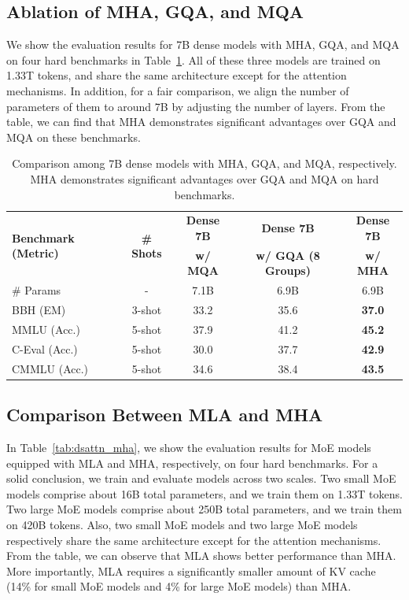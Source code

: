 \documentclass[11pt, a4paper, logo, copyright, nonumbering]{deepseek}
\newcommand{\dsattn}{MLA}
\begin{document}
\begin{CJK*}{UTF8}{gbsn}
\subsection{Ablation of MHA, GQA, and MQA}
\label{app:mha_gqa_mqa}

We show the evaluation results for 7B dense models with MHA, GQA, and MQA on four hard benchmarks in Table~\ref{tab:mha_gqa_mqa}. 
All of these three models are trained on 1.33T tokens, and share the same architecture except for the attention mechanisms. 
In addition, for a fair comparison, we align the number of parameters of them to around 7B by adjusting the number of layers. 
From the table, we can find that MHA demonstrates significant advantages over GQA and MQA on these benchmarks. 

\begin{table}[ht]
    \centering
    \begin{tabular}{@{}l c | c c c@{}}
    \toprule
    \multirow{2}{*}{\centering \textbf{Benchmark (Metric)}} & \multirow{2}{*}{\textbf{\# Shots}} & \textbf{Dense 7B} & \textbf{Dense 7B} & \textbf{Dense 7B} \\
     & & \textbf{w/ MQA} & \textbf{w/ GQA (8 Groups)} & \textbf{w/ MHA} \\
    \midrule
    \# Params & - & 7.1B & 6.9B & 6.9B \\
    \midrule
    BBH (EM) & 3-shot & 33.2 & 35.6 & \textbf{37.0} \\
    MMLU (Acc.) & 5-shot & 37.9 & 41.2 & \textbf{45.2} \\
    C-Eval (Acc.) & 5-shot & 30.0 & 37.7 & \textbf{42.9} \\
    CMMLU (Acc.) & 5-shot & 34.6 & 38.4 & \textbf{43.5} \\
    \bottomrule
    \end{tabular}
    \caption{
    Comparison among 7B dense models with MHA, GQA, and MQA, respectively. 
    MHA demonstrates significant advantages over GQA and MQA on hard benchmarks. 
    }
    \label{tab:mha_gqa_mqa}
\end{table}

\subsection{Comparison Between \dsattn{} and MHA}
\label{app:dsattn_mha}

In Table~\ref{tab:dsattn_mha}, we show the evaluation results for MoE models equipped with \dsattn{} and MHA, respectively, on four hard benchmarks. 
For a solid conclusion, we train and evaluate models across two scales. 
Two small MoE models comprise about 16B total parameters, and we train them on 1.33T tokens. 
Two large MoE models comprise about 250B total parameters, and we train them on 420B tokens. 
Also, two small MoE models and two large MoE models respectively share the same architecture except for the attention mechanisms. 
From the table, we can observe that \dsattn{} shows better performance than MHA. 
More importantly, \dsattn{} requires a significantly smaller amount of KV cache (14\% for small MoE models and 4\% for large MoE models) than MHA. 


\end{CJK*}
\end{document}
